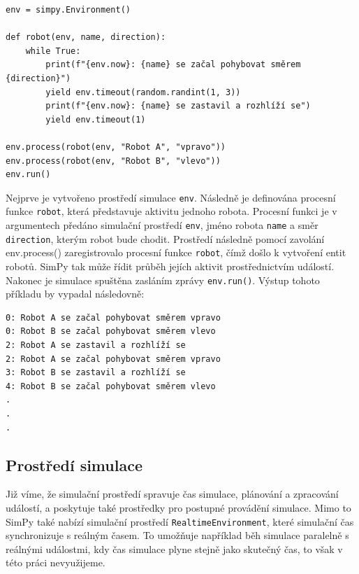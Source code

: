 \documentclass[12pt,a4paper]{article}
\begin{document}
 \begin{verbatim} 
env = simpy.Environment()

def robot(env, name, direction):
    while True:
        print(f"{env.now}: {name} se začal pohybovat směrem {direction}")
        yield env.timeout(random.randint(1, 3))
        print(f"{env.now}: {name} se zastavil a rozhlíží se")
        yield env.timeout(1)       

env.process(robot(env, "Robot A", "vpravo"))
env.process(robot(env, "Robot B", "vlevo"))
env.run()
\end{verbatim}

\noindent Nejprve je vytvořeno prostředí simulace \texttt{env}. Následně je definována procesní funkce \texttt{robot}, která představuje aktivitu jednoho robota. Procesní funkci je v argumentech předáno simulační prostředí \texttt{env}, jméno robota \texttt{name} a směr \texttt{direction}, kterým robot bude chodit. Prostředí následně pomocí zavolání env.process() zaregistrovalo procesní funkce \texttt{robot}, čímž došlo k vytvoření entit robotů. SimPy tak může řídit průběh jejích aktivit prostřednictvím událostí. Nakonec je simulace spuštěna zasláním zprávy \texttt{env.run()}. Výstup tohoto příkladu by vypadal následovně:

 \begin{verbatim} 
0: Robot A se začal pohybovat směrem vpravo
0: Robot B se začal pohybovat směrem vlevo
2: Robot A se zastavil a rozhlíží se
2: Robot A se začal pohybovat směrem vpravo
3: Robot B se zastavil a rozhlíží se
4: Robot B se začal pohybovat směrem vlevo
.
.
.
\end{verbatim}

\subsection{Prostředí simulace}
Již víme, že simulační prostředí spravuje čas simulace, plánování a zpracování událostí, a poskytuje také prostředky pro postupné provádění simulace. Mimo to SimPy také nabízí simulační prostředí \texttt{RealtimeEnvironment}, které simulační čas synchronizuje s reálným časem. To umožňuje například běh simulace paralelně s reálnými událostmi, kdy čas simulace plyne stejně jako skutečný čas, to však v této práci nevyužijeme.
\end{document}
